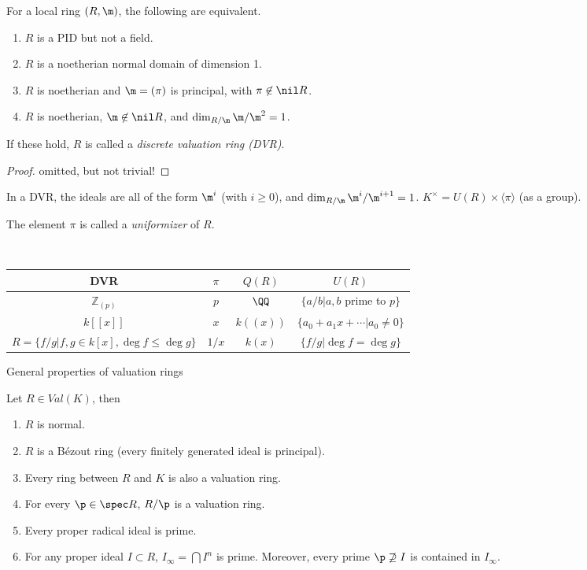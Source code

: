 \begin{theorem}
  For a local ring $(R,\m)$, the following are equivalent.
  \begin{enumerate}
    \item $R$ is a PID but not a field.
    \item $R$ is a noetherian normal domain of dimension 1.
    \item $R$ is noetherian and $\m = (\pi)$ is principal, with $\pi\not\in \nil R$.
    \item $R$ is noetherian, $\m\not\in \nil R$, and $\dim_{R/\m} \m/\m^2=1$.
  \end{enumerate}
  If these hold, $R$ is called a \emph{discrete valuation ring (DVR)}.
\end{theorem}
\begin{proof}
  omitted, but not trivial! \anton{}
\end{proof}
\begin{remark}
  In a DVR, the ideals are all of the form $\m^i$ (with $i\ge 0$), and $\dim_{R/\m}
  \m^i/\m^{i+1}=1$. $K^\times = U(R)\times \langle \pi\rangle$ (as a group).
\end{remark}
\begin{definition}
  The element $\pi$ is called a \emph{uniformizer} of $R$.
\end{definition}
\begin{example}\\
  \begin{tabular}{c|c|c|c}
    DVR & $\pi$ & $Q(R)$ & $U(R)$\\ \hline
    $\mathbb{Z}_{(p)}$ & $p$ & $\QQ$ & $\{a/b| a,b$ prime to $p\}$\\
    $k[[x]]$ & $x$ & $k((x))$ & $\{a_0+a_1x+\cdots|a_0\neq 0\}$\\
    $R=\{f/g| f,g\in k[x], \deg f\le \deg g\}$ & $1/x$ & $k(x)$ & $\{f/g|\deg f=\deg g\}$
  \end{tabular}
\end{example}
General properties of valuation rings
\begin{theorem}
  Let $R\in Val(K)$, then
  \begin{enumerate}
    \item $R$ is normal.
    \item $R$ is a B\'ezout ring (every finitely generated ideal is principal).
    \item Every ring between $R$ and $K$ is also a valuation ring.
    \item For every $\p\in \spec R$, $R/\p$ is a valuation ring.
    \item Every proper radical ideal is prime.
    \item For any proper ideal $I\subset R$, $I_\infty = \bigcap I^n$ is prime. Moreover,
    every prime $\p\not\supseteq I$ is contained in $I_\infty$.
  \end{enumerate}
\end{theorem}
